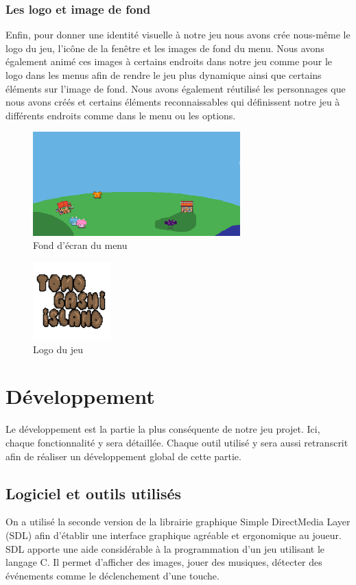 \documentclass{article}
\begin{document}
\subsubsection{Les logo et image de fond}
Enfin, pour donner une identité visuelle à notre jeu nous avons crée nous-même le logo du jeu, l'icône de la fenêtre et les images de fond du menu. Nous avons également animé ces images à certains endroits dans notre jeu comme pour le logo dans les menus afin de rendre le jeu plus dynamique ainsi que certains éléments sur l'image de fond. Nous avons également réutilisé les personnages que nous avons créés et certains éléments reconnaissables qui définissent notre jeu à différents endroits comme dans le menu ou les options. %
\begin{figure}[h]
    \centering
    \includegraphics[height = 4cm]{fond.png}
    \caption{Fond d'écran du menu}
\end{figure}
\begin{figure}[h]
    \centering
    \includegraphics[height = 3cm]{logo_1.png}
    \caption{Logo du jeu}
\end{figure}


\section{Développement}
    Le développement est la partie la plus conséquente de notre jeu projet. Ici, chaque fonctionnalité y sera détaillée. Chaque outil utilisé y sera aussi retranscrit afin de réaliser un développement global de cette partie.
\newpage
    \subsection{Logiciel et outils utilisés}
    On a utilisé la seconde version de la librairie graphique Simple DirectMedia Layer (SDL) afin d’établir une interface graphique agréable et ergonomique au joueur. SDL apporte une aide considérable à la programmation d’un jeu utilisant le langage C. Il permet d’afficher des images, jouer des musiques, détecter des événements comme le déclenchement d’une touche. 
\end{document}
